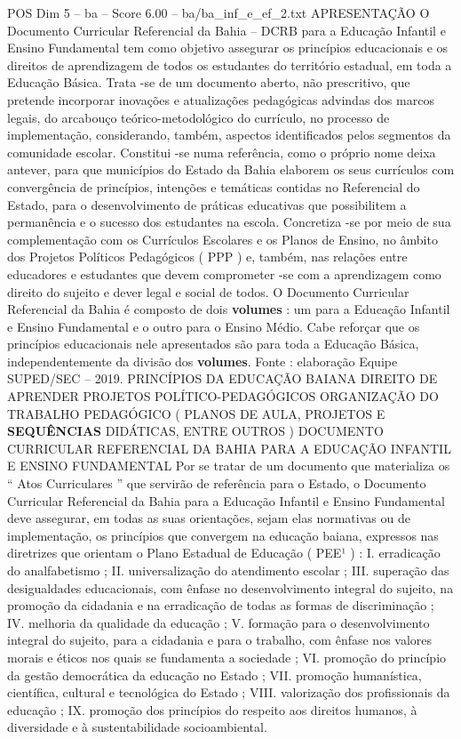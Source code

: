 \begin{textsample}{POS Dim 5 – ba – Score 6.00 – ba/ba\_inf\_e\_ef\_2.txt}  \label{ex:f5_pos_274}
APRESENTAÇÃO O Documento Curricular Referencial da Bahia – DCRB para a Educação Infantil e Ensino Fundamental tem como objetivo assegurar os princípios educacionais e os direitos de aprendizagem de todos os estudantes do território estadual, em toda a Educação Básica.
Trata -se de um documento aberto, não prescritivo, que pretende incorporar inovações e atualizações pedagógicas advindas dos marcos legais, do arcabouço teórico-metodológico do currículo, no processo de implementação, considerando, também, aspectos identificados pelos segmentos da comunidade escolar.
Constitui -se numa referência, como o próprio nome deixa antever, para que municípios do Estado da Bahia elaborem os seus currículos com convergência de princípios, intenções e temáticas contidas no Referencial do Estado, para o desenvolvimento de práticas educativas que possibilitem a permanência e o sucesso dos estudantes na escola.
Concretiza -se por meio de sua complementação com os Currículos Escolares e os Planos de Ensino, no âmbito dos Projetos Políticos Pedagógicos ( PPP ) e, também, nas relações entre educadores e estudantes que devem comprometer -se com a aprendizagem como direito do sujeito e dever legal e social de todos.
O Documento Curricular Referencial da Bahia é composto de dois \textbf{volumes} : um para a Educação Infantil e Ensino Fundamental e o outro para o Ensino Médio.
Cabe reforçar que os princípios educacionais nele apresentados são para toda a Educação Básica, independentemente da divisão dos \textbf{volumes}.
Fonte : elaboração Equipe SUPED/SEC – 2019.
PRINCÍPIOS DA EDUCAÇÃO BAIANA DIREITO DE APRENDER PROJETOS POLÍTICO-PEDAGÓGICOS ORGANIZAÇÃO DO TRABALHO PEDAGÓGICO ( PLANOS DE AULA, PROJETOS E \textbf{SEQUÊNCIAS} DIDÁTICAS, ENTRE OUTROS ) DOCUMENTO CURRICULAR REFERENCIAL DA BAHIA PARA A EDUCAÇÃO INFANTIL E ENSINO FUNDAMENTAL Por se tratar de um documento que materializa os “ Atos Curriculares ” que servirão de referência para o Estado, o Documento Curricular Referencial da Bahia para a Educação Infantil e Ensino Fundamental deve assegurar, em todas as suas orientações, sejam elas normativas ou de implementação, os princípios que convergem na educação baiana, expressos nas diretrizes que orientam o Plano Estadual de Educação ( PEE¹ ) : I. erradicação do analfabetismo ; II. universalização do atendimento escolar ; III. superação das desigualdades educacionais, com ênfase no desenvolvimento integral do sujeito, na promoção da cidadania e na erradicação de todas as formas de discriminação ; IV. melhoria da qualidade da educação ; V. formação para o desenvolvimento integral do sujeito, para a cidadania e para o trabalho, com ênfase nos valores morais e éticos nos quais se fundamenta a sociedade ; VI. promoção do princípio da gestão democrática da educação no Estado ; VII. promoção humanística, científica, cultural e tecnológica do Estado ; VIII. valorização dos profissionais da educação ; IX. promoção dos princípios do respeito aos direitos humanos, à diversidade e à sustentabilidade socioambiental.

\end{textsample}

